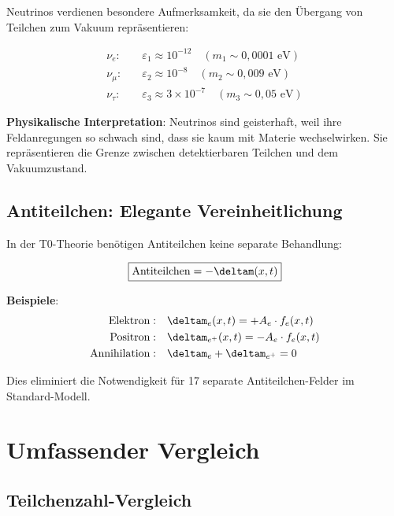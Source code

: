 	Neutrinos verdienen besondere Aufmerksamkeit, da sie den Übergang von Teilchen zum Vakuum repräsentieren:
	
	\begin{equation}
		\begin{aligned}
			\nu_e: \quad &\varepsilon_1 \approx 10^{-12} \quad (m_1 \sim 0{,}0001 \text{ eV}) \\
			\nu_\mu: \quad &\varepsilon_2 \approx 10^{-8} \quad (m_2 \sim 0{,}009 \text{ eV}) \\
			\nu_\tau: \quad &\varepsilon_3 \approx 3 \times 10^{-7} \quad (m_3 \sim 0{,}05 \text{ eV})
		\end{aligned}
		\label{eq:neutrino_spectrum}
	\end{equation}
	
	\textbf{Physikalische Interpretation}: Neutrinos sind geisterhaft, weil ihre Feldanregungen so schwach sind, dass sie kaum mit Materie wechselwirken. Sie repräsentieren die Grenze zwischen detektierbaren Teilchen und dem Vakuumzustand.
	
	\subsection{Antiteilchen: Elegante Vereinheitlichung}
	
	In der T0-Theorie benötigen Antiteilchen keine separate Behandlung:
	
	\begin{equation}
		\boxed{\text{Antiteilchen} = -\deltam(x,t)}
		\label{eq:antiparticle_unification}
	\end{equation}
	
	\textbf{Beispiele}:
	\begin{align}
		\text{Elektron}: \quad &\deltam_e(x,t) = +A_e \cdot f_e(x,t) \\
		\text{Positron}: \quad &\deltam_{e^+}(x,t) = -A_e \cdot f_e(x,t) \\
		\text{Annihilation}: \quad &\deltam_e + \deltam_{e^+} = 0
	\end{align}
	
	Dies eliminiert die Notwendigkeit für 17 separate Antiteilchen-Felder im Standard-Modell.
	
	\section{Umfassender Vergleich}
	
	\subsection{Teilchenzahl-Vergleich}
	
